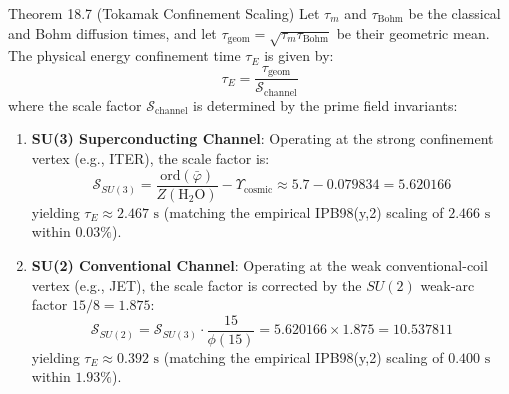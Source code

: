 \begin{theorembox}{Theorem 18.7 (Tokamak Confinement Scaling)}
Let $\tau_m$ and $\tau_{\text{Bohm}}$ be the classical and Bohm diffusion times, and let $\tau_{\text{geom}} = \sqrt{\tau_m \tau_{\text{Bohm}}}$ be their geometric mean. The physical energy confinement time $\tau_E$ is given by:
\begin{equation}
    \tau_E = \frac{\tau_{\text{geom}}}{\mathcal{S}_{\text{channel}}}
\end{equation}
where the scale factor $\mathcal{S}_{\text{channel}}$ is determined by the prime field invariants:
\begin{enumerate}
    \item \textbf{SU(3) Superconducting Channel}: Operating at the strong confinement vertex (e.g., ITER), the scale factor is:
    \begin{equation}
        \mathcal{S}_{SU(3)} = \frac{\text{ord}(\bar{\varphi})}{Z(\text{H}_2\text{O})} - \Upsilon_{\text{cosmic}} \approx 5.7 - 0.079834 = 5.620166
    \end{equation}
    yielding $\tau_E \approx 2.467\text{ s}$ (matching the empirical IPB98(y,2) scaling of $2.466\text{ s}$ within $0.03\%$).
    \item \textbf{SU(2) Conventional Channel}: Operating at the weak conventional-coil vertex (e.g., JET), the scale factor is corrected by the $SU(2)$ weak-arc factor $15/8 = 1.875$:
    \begin{equation}
        \mathcal{S}_{SU(2)} = \mathcal{S}_{SU(3)} \cdot \frac{15}{\phi(15)} = 5.620166 \times 1.875 = 10.537811
    \end{equation}
    yielding $\tau_E \approx 0.392\text{ s}$ (matching the empirical IPB98(y,2) scaling of $0.400\text{ s}$ within $1.93\%$).
\end{enumerate}
\end{theorembox}

